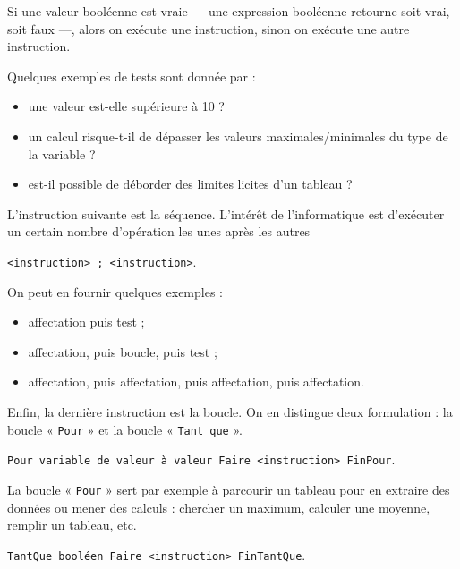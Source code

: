 Si une valeur booléenne est vraie --- une expression booléenne retourne soit vrai, soit faux ---, alors on exécute une instruction, sinon on exécute une autre instruction.

Quelques exemples de tests sont donnée par :
\begin{itemize}
\item une valeur est-elle supérieure à 10 ?
\item un calcul risque-t-il de dépasser les valeurs maximales/minimales du type de la variable ?
\item est-il possible de déborder des limites licites d'un tableau ?
\end{itemize}

L'instruction suivante est la séquence. L'intérêt de l'informatique est d'exécuter un certain nombre d'opération les unes après les autres

\vspace{-0.7\baselineskip}
\begin{center}
\lstinline[style=lstalgostyle,basicstyle=\normalsize\shellttfont]{<instruction> ; <instruction>}.
\end{center}
\vspace{-0.7\baselineskip}

On peut en fournir quelques exemples :
\begin{itemize}
\item affectation puis test ;
\item affectation, puis boucle, puis test ;
\item affectation, puis affectation, puis affectation, puis affectation.
\end{itemize}

Enfin, la dernière instruction est la boucle. On en distingue deux formulation : la boucle « \texttt{Pour} » et la boucle « \texttt{Tant que} ».

\vspace{-0.7\baselineskip}
\begin{center}
\lstinline[style=lstalgostyle,basicstyle=\normalsize\shellttfont]{Pour variable de valeur à valeur Faire <instruction> FinPour}.
\end{center}
\vspace{-0.7\baselineskip}

La boucle « \texttt{Pour} » sert par exemple à parcourir un tableau pour en extraire des données ou mener des calculs : chercher un maximum, calculer une moyenne, remplir un tableau, etc.

\vspace{-0.7\baselineskip}
\begin{center}
\lstinline[style=lstalgostyle,basicstyle=\normalsize\shellttfont]{TantQue booléen Faire <instruction> FinTantQue}.
\end{center}
\vspace{-0.7\baselineskip}

